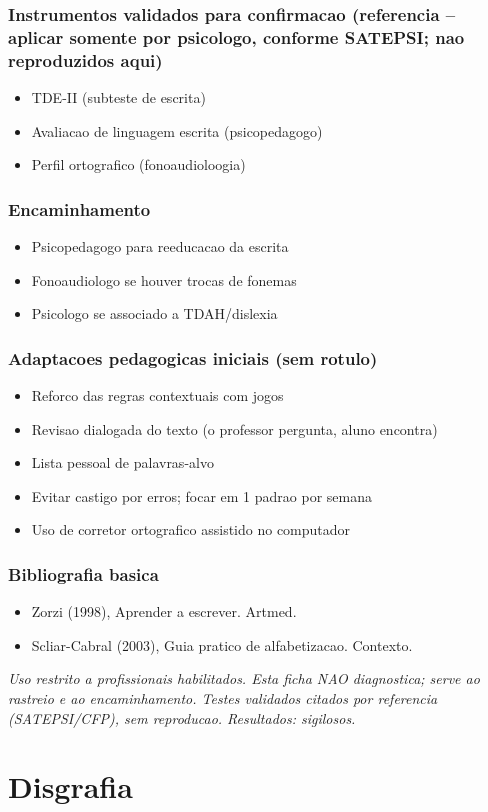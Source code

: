 \documentclass[a4paper,11pt]{book}
\newcommand{\avisolegal}{\par\medskip\noindent\footnotesize\itshape
\color{cinza}Uso restrito a profissionais habilitados. Esta ficha NAO diagnostica;
serve ao rastreio e ao encaminhamento. Testes validados citados por referencia
(SATEPSI/CFP), sem reproducao. Resultados: sigilosos.\color{black}\par}
\begin{document}
\subsection*{Instrumentos validados para confirmacao (referencia -- aplicar somente por psicologo, conforme SATEPSI; nao reproduzidos aqui)}
\begin{itemize}
\item TDE-II (subteste de escrita)
\item Avaliacao de linguagem escrita (psicopedagogo)
\item Perfil ortografico (fonoaudioloogia)
\end{itemize}
\subsection*{Encaminhamento}
\begin{itemize}
\item Psicopedagogo para reeducacao da escrita
\item Fonoaudiologo se houver trocas de fonemas
\item Psicologo se associado a TDAH/dislexia
\end{itemize}
\subsection*{Adaptacoes pedagogicas iniciais (sem rotulo)}
\begin{itemize}
\item Reforco das regras contextuais com jogos
\item Revisao dialogada do texto (o professor pergunta, aluno encontra)
\item Lista pessoal de palavras-alvo
\item Evitar castigo por erros; focar em 1 padrao por semana
\item Uso de corretor ortografico assistido no computador
\end{itemize}
\subsection*{Bibliografia basica}
\begin{itemize}
\item Zorzi (1998), Aprender a escrever. Artmed.
\item Scliar-Cabral (2003), Guia pratico de alfabetizacao. Contexto.
\end{itemize}
\avisolegal


\chapter{Disgrafia}
\end{document}
